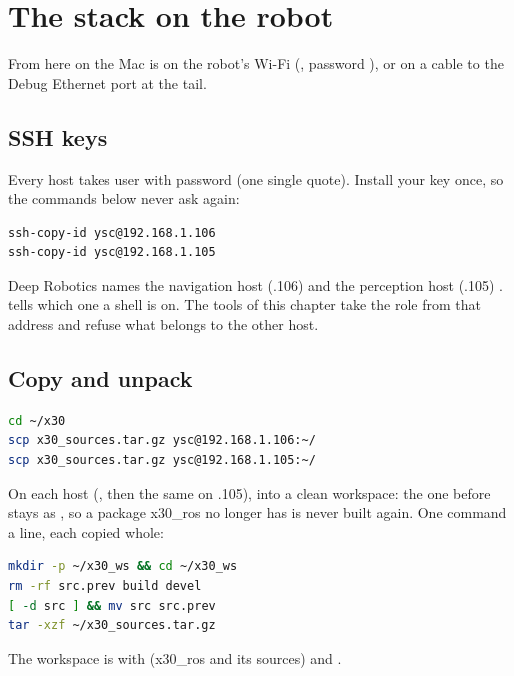 \chapter{The stack on the robot}
\label{ch:i-robot}

From here on the Mac is on the robot's Wi-Fi (, password ), or on
a cable to the Debug Ethernet port at the tail.

\section{SSH keys}

Every host takes user  with password  (one single quote). Install your key
once, so the commands below never ask again:

\begin{lstlisting}[language=bash]
ssh-copy-id ysc@192.168.1.106
ssh-copy-id ysc@192.168.1.105
\end{lstlisting}

\begin{warnbox}
Deep Robotics names the navigation host (.106)  and the perception host
(.105) .  tells which one a shell is on. The tools of this chapter
take the role from that address and refuse what belongs to the other host.
\end{warnbox}

\section{Copy and unpack}

\begin{lstlisting}[language=bash]
cd ~/x30
scp x30_sources.tar.gz ysc@192.168.1.106:~/
scp x30_sources.tar.gz ysc@192.168.1.105:~/
\end{lstlisting}

On each host (, then the same on .105), into a clean workspace: the
one before stays as , so a package x30\_ros no longer has is never built again.
One command a line, each copied whole:

\begin{lstlisting}[language=bash]
mkdir -p ~/x30_ws && cd ~/x30_ws
rm -rf src.prev build devel
[ -d src ] && mv src src.prev
tar -xzf ~/x30_sources.tar.gz
\end{lstlisting}

The workspace is  with  (x30\_ros and its sources) and
.

